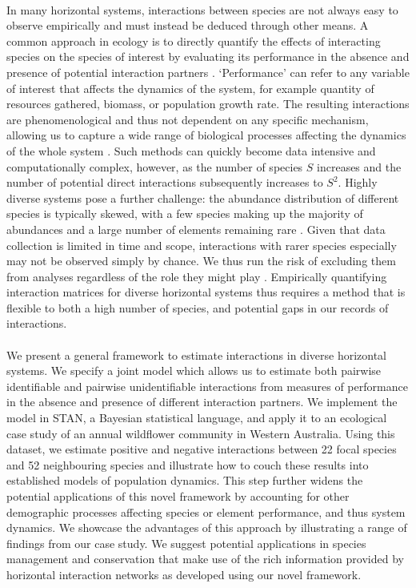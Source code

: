 \documentclass[a4,12pt]{article}
\begin{document}
    \paragraph{} 
    In many horizontal systems, interactions between species are not always easy to observe empirically and must instead be deduced through other means. A common approach in ecology is to directly quantify the effects of interacting species on the species of interest by evaluating its performance in the absence and presence of potential interaction partners \parencite{Connell1961, Grace1990}. `Performance' can refer to any variable of interest that affects the dynamics of the system, for example quantity of resources gathered, biomass, or population growth rate. The resulting interactions are phenomenological and thus not dependent on any specific mechanism, allowing us to capture a wide range of biological processes affecting the dynamics of the whole system \parencite{Novak2010}. Such methods can quickly become data intensive and computationally complex, however, as the number of species $S$ increases and the number of potential direct interactions subsequently increases to $S^2$. Highly diverse systems pose a further challenge: the abundance distribution of different species is typically skewed, with a few species making up the majority of abundances and a large number of elements remaining rare \parencite{Fisher1943}. Given that data collection is limited in time and scope, interactions with rarer species especially may not be observed simply by chance. We thus run the risk of excluding them from analyses regardless of the role they might play \parencite{Olesen2011}. Empirically quantifying interaction matrices for diverse horizontal systems thus requires a method that is flexible to both a high number of species, and potential gaps in our records of interactions. 


    \paragraph{} 
    We present a general framework to estimate interactions in diverse horizontal systems. We specify a joint model which allows us to estimate both pairwise identifiable and pairwise unidentifiable interactions from measures of performance in the absence and presence of different interaction partners. We implement the model in STAN, a Bayesian statistical language, and apply it to an ecological case study of an annual wildflower community in Western Australia. Using this dataset, we estimate positive and negative interactions between 22 focal species and 52 neighbouring species and illustrate how to couch these results into established models of population dynamics. This step further widens the potential applications of this novel framework by accounting for other demographic processes affecting species or element performance, and thus system dynamics. We showcase the advantages of this approach by illustrating a range of findings from our case study. We suggest potential applications in species management and conservation that make use of the rich information provided by horizontal interaction networks as developed using our novel framework.
\end{document}
